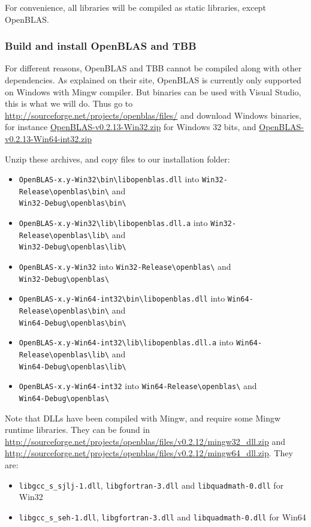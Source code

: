 For convenience, all libraries will be compiled as static libraries, except OpenBLAS.

\subsubsection{Build and install OpenBLAS and TBB}

For different reasons, OpenBLAS and TBB cannot be compiled along with other dependencies.  As explained on
their site, OpenBLAS is currently only supported on Windows with Mingw compiler.  But binaries can be
used with Visual Studio, this is what we will do.  Thus go to
\url{http://sourceforge.net/projects/openblas/files/} and download Windows binaries, for instance
\url{OpenBLAS-v0.2.13-Win32.zip} for Windows 32 bits, and \url{OpenBLAS-v0.2.13-Win64-int32.zip}

Unzip these archives, and copy files to our installation folder:
\begin{itemize}
\item \verb+OpenBLAS-x.y-Win32\bin\libopenblas.dll+ into \verb+Win32-Release\openblas\bin\+ and\\
      \verb+Win32-Debug\openblas\bin\+
\item \verb+OpenBLAS-x.y-Win32\lib\libopenblas.dll.a+ into \verb+Win32-Release\openblas\lib\+ and\\
      \verb+Win32-Debug\openblas\lib\+
\item \verb+OpenBLAS-x.y-Win32+ into \verb+Win32-Release\openblas\+ and\\
      \verb+Win32-Debug\openblas\+
\item \verb+OpenBLAS-x.y-Win64-int32\bin\libopenblas.dll+ into \verb+Win64-Release\openblas\bin\+ and\\
      \verb+Win64-Debug\openblas\bin\+
\item \verb+OpenBLAS-x.y-Win64-int32\lib\libopenblas.dll.a+ into \verb+Win64-Release\openblas\lib\+ and\\
      \verb+Win64-Debug\openblas\lib\+
\item \verb+OpenBLAS-x.y-Win64-int32+ into \verb+Win64-Release\openblas\+ and\\
      \verb+Win64-Debug\openblas\+
\end{itemize}

Note that DLLs have been compiled with Mingw, and require some Mingw runtime libraries.  They can be found in
\url{http://sourceforge.net/projects/openblas/files/v0.2.12/mingw32_dll.zip} and
\url{http://sourceforge.net/projects/openblas/files/v0.2.12/mingw64_dll.zip}.
They are:
\begin{itemize}
\item \verb+libgcc_s_sjlj-1.dll+, \verb+libgfortran-3.dll+ and \verb+libquadmath-0.dll+ for Win32
\item \verb+libgcc_s_seh-1.dll+, \verb+libgfortran-3.dll+ and \verb+libquadmath-0.dll+ for Win64
\end{itemize}

